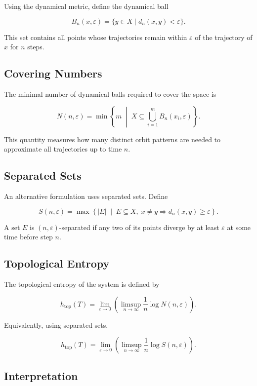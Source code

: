 \documentclass[12pt]{article}
\begin{document}
Using the dynamical metric, define the dynamical ball

\[
B_n(x,\varepsilon) =
\{ y \in X \mid d_n(x,y) < \varepsilon \}.
\]

This set contains all points whose trajectories remain within $\varepsilon$ of the trajectory of $x$ for $n$ steps.

\subsection{Covering Numbers}

The minimal number of dynamical balls required to cover the space is

\[
N(n,\varepsilon) =
\min
\left\{
m \;\middle|\;
X \subseteq \bigcup_{i=1}^m B_n(x_i,\varepsilon)
\right\}.
\]

This quantity measures how many distinct orbit patterns are needed to approximate all trajectories up to time $n$.

\subsection{Separated Sets}

An alternative formulation uses separated sets. Define

\[
S(n,\varepsilon) =
\max
\left\{
|E| \;\middle|\;
E \subseteq X,\;
x \neq y \Rightarrow d_n(x,y) \ge \varepsilon
\right\}.
\]

A set $E$ is $(n,\varepsilon)$-separated if any two of its points diverge by at least $\varepsilon$ at some time before step $n$.

\subsection{Topological Entropy}

The topological entropy of the system is defined by

\[
h_{\mathrm{top}}(T)
=
\lim_{\varepsilon \to 0}
\left(
\limsup_{n \to \infty}
\frac{1}{n} \log N(n,\varepsilon)
\right).
\]

Equivalently, using separated sets,

\[
h_{\mathrm{top}}(T)
=
\lim_{\varepsilon \to 0}
\left(
\limsup_{n \to \infty}
\frac{1}{n} \log S(n,\varepsilon)
\right).
\]

\subsection{Interpretation}
\end{document}
